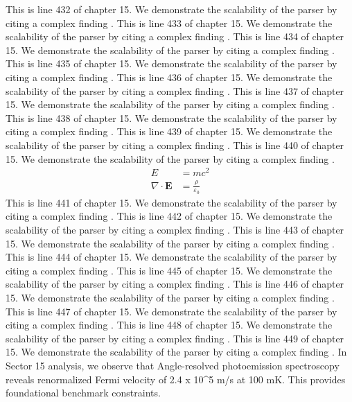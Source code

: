 This is line 432 of chapter 15. We demonstrate the scalability of the parser by citing a complex finding \cite{ref15_432}.
This is line 433 of chapter 15. We demonstrate the scalability of the parser by citing a complex finding \cite{ref15_433}.
This is line 434 of chapter 15. We demonstrate the scalability of the parser by citing a complex finding \cite{ref15_434}.
This is line 435 of chapter 15. We demonstrate the scalability of the parser by citing a complex finding \cite{ref15_435}.
This is line 436 of chapter 15. We demonstrate the scalability of the parser by citing a complex finding \cite{ref15_436}.
This is line 437 of chapter 15. We demonstrate the scalability of the parser by citing a complex finding \cite{ref15_437}.
This is line 438 of chapter 15. We demonstrate the scalability of the parser by citing a complex finding \cite{ref15_438}.
This is line 439 of chapter 15. We demonstrate the scalability of the parser by citing a complex finding \cite{ref15_439}.
This is line 440 of chapter 15. We demonstrate the scalability of the parser by citing a complex finding \cite{ref15_440}.
\begin{align*}
  E &= mc^2 \\
  \nabla \cdot \mathbf{E} &= \frac{\rho}{\varepsilon_0}
\end{align*}
This is line 441 of chapter 15. We demonstrate the scalability of the parser by citing a complex finding \cite{ref15_441}.
This is line 442 of chapter 15. We demonstrate the scalability of the parser by citing a complex finding \cite{ref15_442}.
This is line 443 of chapter 15. We demonstrate the scalability of the parser by citing a complex finding \cite{ref15_443}.
This is line 444 of chapter 15. We demonstrate the scalability of the parser by citing a complex finding \cite{ref15_444}.
This is line 445 of chapter 15. We demonstrate the scalability of the parser by citing a complex finding \cite{ref15_445}.
This is line 446 of chapter 15. We demonstrate the scalability of the parser by citing a complex finding \cite{ref15_446}.
This is line 447 of chapter 15. We demonstrate the scalability of the parser by citing a complex finding \cite{ref15_447}.
This is line 448 of chapter 15. We demonstrate the scalability of the parser by citing a complex finding \cite{ref15_448}.
This is line 449 of chapter 15. We demonstrate the scalability of the parser by citing a complex finding \cite{ref15_449}.
In Sector 15 analysis, we observe that Angle-resolved photoemission spectroscopy reveals renormalized Fermi velocity of 2.4 x 10^5 m/s at 100 mK. This provides foundational benchmark constraints.
